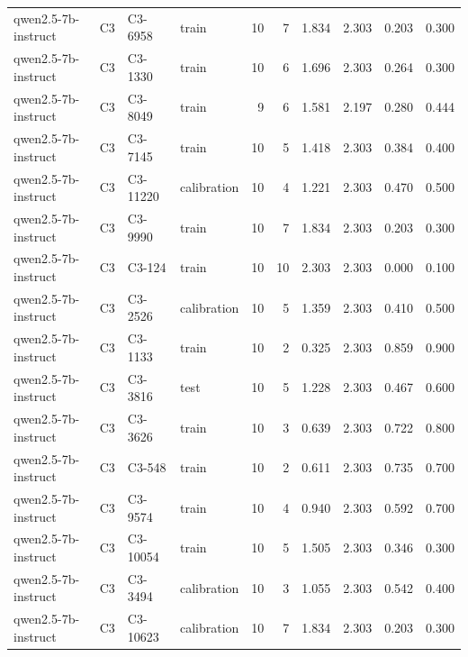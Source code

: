 \begin{table}
\begin{tabular}{llllrrrrrr}
qwen2.5-7b-instruct & C3 & C3-6958 & train & 10 & 7 & 1.834 & 2.303 & 0.203 & 0.300 \\
qwen2.5-7b-instruct & C3 & C3-1330 & train & 10 & 6 & 1.696 & 2.303 & 0.264 & 0.300 \\
qwen2.5-7b-instruct & C3 & C3-8049 & train & 9 & 6 & 1.581 & 2.197 & 0.280 & 0.444 \\
qwen2.5-7b-instruct & C3 & C3-7145 & train & 10 & 5 & 1.418 & 2.303 & 0.384 & 0.400 \\
qwen2.5-7b-instruct & C3 & C3-11220 & calibration & 10 & 4 & 1.221 & 2.303 & 0.470 & 0.500 \\
qwen2.5-7b-instruct & C3 & C3-9990 & train & 10 & 7 & 1.834 & 2.303 & 0.203 & 0.300 \\
qwen2.5-7b-instruct & C3 & C3-124 & train & 10 & 10 & 2.303 & 2.303 & 0.000 & 0.100 \\
qwen2.5-7b-instruct & C3 & C3-2526 & calibration & 10 & 5 & 1.359 & 2.303 & 0.410 & 0.500 \\
qwen2.5-7b-instruct & C3 & C3-1133 & train & 10 & 2 & 0.325 & 2.303 & 0.859 & 0.900 \\
qwen2.5-7b-instruct & C3 & C3-3816 & test & 10 & 5 & 1.228 & 2.303 & 0.467 & 0.600 \\
qwen2.5-7b-instruct & C3 & C3-3626 & train & 10 & 3 & 0.639 & 2.303 & 0.722 & 0.800 \\
qwen2.5-7b-instruct & C3 & C3-548 & train & 10 & 2 & 0.611 & 2.303 & 0.735 & 0.700 \\
qwen2.5-7b-instruct & C3 & C3-9574 & train & 10 & 4 & 0.940 & 2.303 & 0.592 & 0.700 \\
qwen2.5-7b-instruct & C3 & C3-10054 & train & 10 & 5 & 1.505 & 2.303 & 0.346 & 0.300 \\
qwen2.5-7b-instruct & C3 & C3-3494 & calibration & 10 & 3 & 1.055 & 2.303 & 0.542 & 0.400 \\
qwen2.5-7b-instruct & C3 & C3-10623 & calibration & 10 & 7 & 1.834 & 2.303 & 0.203 & 0.300 \\
\bottomrule
\end{tabular}
\end{table}
